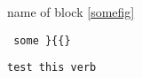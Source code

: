 \begin{block}{name of block}
\ref{somefig}
\begin{verbatim} some }{{} \end{verbatim}

\verb!test this verb!

\end{block}